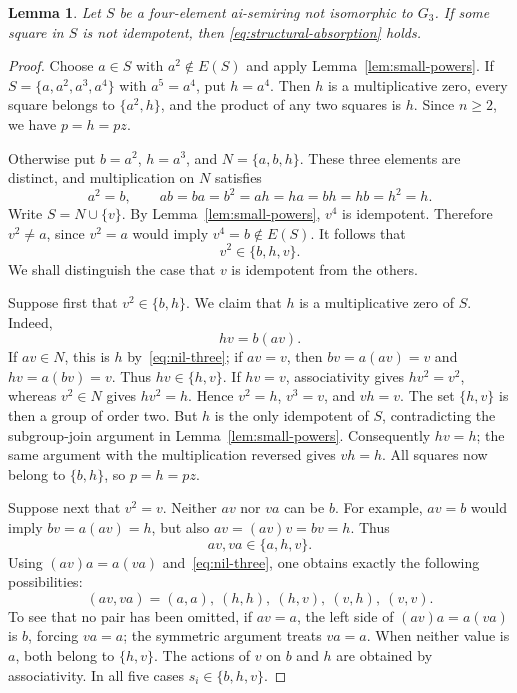 \documentclass[11pt,reqno]{amsart}
\newtheorem{lemma}[theorem]{Lemma}
\theoremstyle{remark}
\numberwithin{equation}{section}
\begin{document}
\begin{lemma}\label{lem:nonidempotent-square-absorption}
Let $S$ be a four-element ai-semiring not isomorphic to $G_3$.
If some square in $S$ is not idempotent, then
\eqref{eq:structural-absorption} holds.
\end{lemma}
\begin{proof}
Choose $a\in S$ with $a^2\notin E(S)$ and apply
Lemma~\ref{lem:small-powers}. If
$S=\{a,a^2,a^3,a^4\}$ with $a^5=a^4$, put $h=a^4$.
Then $h$ is a multiplicative zero, every square belongs to
$\{a^2,h\}$, and the product of any two squares is $h$.
Since $n\geq2$, we have $p=h=pz$.

Otherwise put $b=a^2$, $h=a^3$, and
$N=\{a,b,h\}$. These three elements are distinct, and multiplication
on $N$ satisfies
\begin{equation}\label{eq:nil-three}
a^2=b,\qquad ab=ba=b^2=ah=ha=bh=hb=h^2=h.
\end{equation}
Write $S=N\cup\{v\}$. By Lemma~\ref{lem:small-powers}, $v^4$ is
idempotent. Therefore $v^2\ne a$, since $v^2=a$ would imply
$v^4=b\notin E(S)$. It follows that
\[
v^2\in\{b,h,v\}.
\]
We shall distinguish the case that $v$ is idempotent from the others.

Suppose first that $v^2\in\{b,h\}$. We claim that $h$ is a
multiplicative zero of $S$. Indeed,
\[
hv=b(av).
\]
If $av\in N$, this is $h$ by~\eqref{eq:nil-three}; if $av=v$,
then $bv=a(av)=v$ and $hv=a(bv)=v$. Thus $hv\in\{h,v\}$.
If $hv=v$, associativity gives $hv^2=v^2$, whereas $v^2\in N$
gives $hv^2=h$. Hence $v^2=h$, $v^3=v$, and $vh=v$.
The set $\{h,v\}$ is then a group of order two. But $h$ is the only
idempotent of $S$, contradicting the subgroup-join argument in
Lemma~\ref{lem:small-powers}. Consequently $hv=h$; the same argument
with the multiplication reversed gives $vh=h$. All squares now belong
to $\{b,h\}$, so $p=h=pz$.

Suppose next that $v^2=v$. Neither $av$ nor $va$ can be $b$.
For example, $av=b$ would imply $bv=a(av)=h$, but also
$av=(av)v=bv=h$. Thus
\[
av,va\in\{a,h,v\}.
\]
Using $(av)a=a(va)$ and~\eqref{eq:nil-three}, one obtains exactly
the following possibilities:
\begin{equation}\label{eq:extension-actions}
(av,va)=(a,a),\ (h,h),\ (h,v),\ (v,h),\ (v,v).
\end{equation}
To see that no pair has been omitted, if $av=a$, the left side of
$(av)a=a(va)$ is $b$, forcing $va=a$; the symmetric argument treats
$va=a$. When neither value is $a$, both belong to $\{h,v\}$.
The actions of $v$ on $b$ and $h$ are obtained by associativity.
In all five cases $s_i\in\{b,h,v\}$.


\end{proof}
\end{document}
